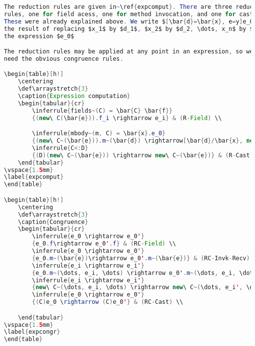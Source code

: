 \begin{lstlisting}[language=Java]
The reduction rules are given in~\ref{expcomput}. There are three reduction
rules, one for field acess, one for method invocation, and one for casting.
These were already explained above. We write $[\bar{d}=\bar{x}, e=y]e_0$ for
the result of replacing $x_1$ by $d_1$, $x_2$ by $d_2, \dots, x_n$ by $d_n$, and $y$ by $e$ in
the expression $e_0$

The reduction rules may be applied at any point in an expression, so we also
need the obvious congruence rules.

\begin{table}[h!]
	\centering
	\def\arraystretch{3}
    \caption{Expression computation}
	\begin{tabular}{cr}
		\inferrule{fields~(C) = \bar{C} \bar{f}}
        {(new\ C(\bar{e})).f_i \rightarrow e_i} & (R-Field) \\

		\inferrule{mbody~(m, C) = \bar{x}.e_0}
        {(new\ C~(\bar{e})).m~(\bar{d}) \rightarrow[\bar{d}/\bar{x}, new\ C~(\bar{e})/this]e_0} & (R-Invk)\\
		\inferrule{C<:D}
        {(D)(new\ C~(\bar{e})) \rightarrow new\ C~(\bar{e})} & (R-Cast)\\
	\end{tabular}
\vspace{1.5mm}
\label{expcomput}
\end{table}

\begin{table}[h!]
	\centering
	\def\arraystretch{3}
    \caption{Congruence}
	\begin{tabular}{cr}
		\inferrule{e_0 \rightarrow e_0'}
        {e_0.f\rightarrow e_0'.f} & (RC-Field) \\
		\inferrule{e_0 \rightarrow e_0'}
        {e_0.m~(\bar{e})\rightarrow e_0'.m~(\bar{e})} & (RC-Invk-Recv) \\
		\inferrule{e_i \rightarrow e_i'}
        {e_0.m~(\dots, e_i, \dots) \rightarrow e_0'.m~(\dots, e_i, \dots)} & (RC-Invk-Arg) \\
		\inferrule{e_i \rightarrow e_i'}
        {new\ C~(\dots, e_i, \dots) \rightarrow new\ C~(\dots, e_i', \dots)} & (RC-New-Arg) \\
		\inferrule{e_0 \rightarrow e_0'}
        {(C)e_0 \rightarrow (C)e_0'} & (RC-Cast) \\

	\end{tabular}
\vspace{1.5mm}
\label{expcongr}
\end{table}


\end{lstlisting}

